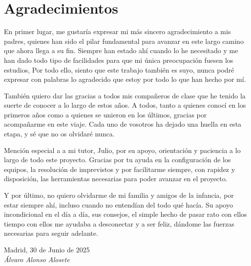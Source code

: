 \cleardoublepage

\chapter*{Agradecimientos}

En primer lugar, me gustaría expresar mi más sincero agradecimiento a mis padres, quienes han sido el pilar fundamental para avanzar en este largo camino que ahora llega a su fin. Siempre han estado ahí cuando lo he necesitado y me han dado todo tipo de facilidades para que mi única preocupación fuesen los estudios, Por todo ello, siento que este trabajo también es suyo, nunca podré expresar con palabras lo agradecido que estoy por todo lo que han hecho por mí.

También quiero dar las gracias a todos mis compañeros de clase que he tenido la suerte de conocer a lo largo de estos años. A todos, tanto a quienes conocí en los primeros años como a quienes se unieron en los últimos, gracias por acompañarme en este viaje. Cada uno de vosotros ha dejado una huella en esta etapa, y sé que no os olvidaré nunca.

Mención especial a a mi tutor, Julio, por su apoyo, orientación y paciencia a lo largo de todo este proyecto. Gracias por tu ayuda en la configuración de los equipos, la resolución de imprevistos y por facilitarme siempre, con rapidez y disposición, las herramientas necesarias para poder avanzar en el proyecto.

Y por último, no quiero olvidarme de mi familia y amigos de la infancia, por estar siempre ahí, incluso cuando no entendían del todo qué hacía. Su apoyo incondicional en el día a día, sus consejos, el simple hecho de pasar rato con ellos tiempo con ellos me ayudaba a desconectar y a ser feliz, dándome las fuerzas necesarias para seguir adelante.


\begin{flushright}
		\vspace{2.0 cm}
		Madrid, 30 de Junio de 2025\\ %
		\emph{Álvaro Alonso Alosete}
\end{flushright}

\thispagestyle{empty}

